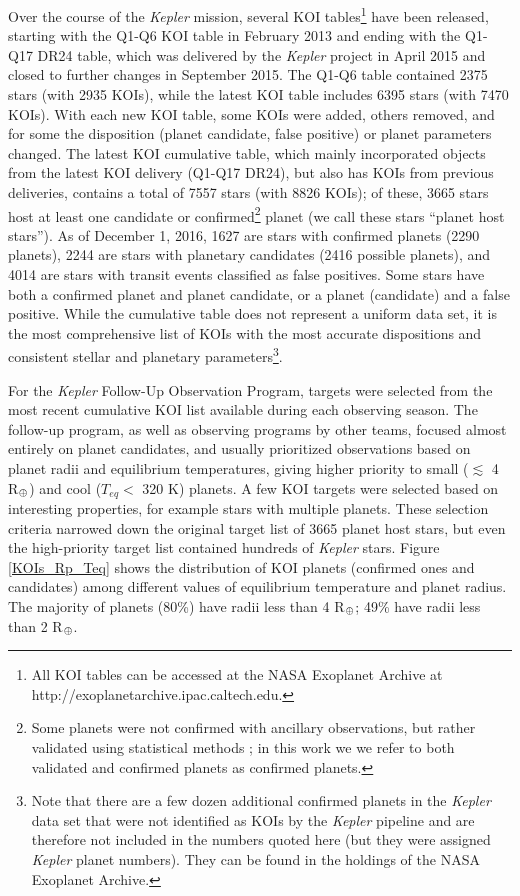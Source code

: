 \documentclass[twocolumn,appendixfloats]{aastex6}
\newcommand{\RE}{R$_{\Earth}$}
\begin{document}
Over the course of the {\it Kepler} mission, several KOI tables\footnote{All KOI tables can
be accessed at the NASA Exoplanet Archive at http://exoplanetarchive.ipac.caltech.edu.} 
have been released, starting with the Q1-Q6 KOI table in February 2013 and 
ending with the Q1-Q17 DR24 table, which was delivered by the {\it Kepler} project in 
April 2015 and closed to further changes in September 2015. 
The Q1-Q6 table contained 2375 stars (with 2935 KOIs), while the latest KOI table 
includes 6395 stars (with 7470 KOIs). With each new KOI table, some KOIs were
added, others removed, and for some the disposition (planet candidate, false 
positive) or planet parameters changed. The latest KOI cumulative table, which 
mainly incorporated objects from the latest KOI delivery (Q1-Q17 DR24), but also 
has KOIs from previous deliveries, contains a total of 7557 stars (with 8826 KOIs); 
of these, 3665 stars host at least one candidate or confirmed\footnote{Some 
planets were not confirmed with ancillary observations, but rather validated 
using statistical methods \citep[see, e.g.,][]{rowe14,morton16}; in this work 
we we refer to both validated and confirmed planets as confirmed planets.}
planet (we call these stars ``planet host stars'').
As of December 1, 2016, 1627 are stars with confirmed planets (2290 planets), 
2244 are stars with planetary candidates (2416 possible planets), and 4014 are stars 
with transit events classified as false positives. Some stars have both a confirmed 
planet and planet candidate, or a planet (candidate) and a false positive. 
While the cumulative table does not represent a uniform data set, it is the most 
comprehensive list of KOIs with the most accurate dispositions and consistent stellar 
and planetary parameters\footnote{Note that there are a few dozen additional 
confirmed planets in the {\it Kepler} data set that were not identified as KOIs 
by the {\it Kepler} pipeline and are therefore not included in the numbers quoted 
here (but they were assigned {\it Kepler} planet numbers). They can be found in 
the holdings of the NASA Exoplanet Archive.}.

For the {\it Kepler} Follow-Up Observation Program, targets were selected from 
the most recent cumulative KOI list available during each observing season. 
The follow-up program, as well as observing programs by other teams, focused 
almost entirely on planet candidates, and usually prioritized observations based 
on planet radii and equilibrium temperatures, giving higher priority to small 
($\lesssim$ 4 \RE) and cool ($T_{eq} <$ 320 K) planets. A few KOI targets 
were selected based on interesting properties, for example stars with multiple 
planets. These selection criteria narrowed down the original target list of 3665 
planet host stars, but even the high-priority target list contained hundreds of 
{\it Kepler} stars. 
Figure \ref{KOIs_Rp_Teq} shows the distribution of KOI planets (confirmed ones 
and candidates) among different values of equilibrium temperature and planet 
radius. The majority of planets (80\%) have radii less than 4 \RE; 49\% have 
radii less than 2 \RE. 
\end{document}
